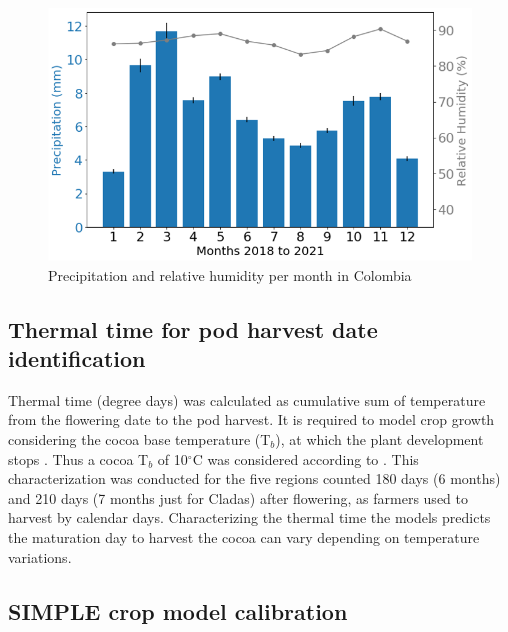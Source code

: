 \documentclass[gene,journal,article,submit,moreauthors,pdftex]{Definitions/mdpi}
\begin{document}
\begin{figure}[h!]
	\centering
	\includegraphics[scale=0.4]{images/rainmonth.png}
	\caption{\footnotesize {Precipitation and relative humidity per month in Colombia \\}}
	\label{fig:rain}
\end{figure}


\subsection{Thermal time for pod harvest date identification}
Thermal time (degree days) was calculated as cumulative sum of temperature from the flowering date to the pod harvest. It is required to model crop growth  considering the cocoa base temperature (T$_{b}$), at which the plant development stops \citep{Ritchie1991}. Thus a cocoa T$_{b}$ of 10$^\circ$C was considered according to \cite{lahive2019}. This characterization was conducted for the five regions counted 180 days (6 months) and 210 days (7 months just for Cladas) after flowering, as farmers used to harvest by calendar days. Characterizing the thermal time the models predicts the maturation day to harvest the cocoa can vary depending on temperature variations.    


\subsection{SIMPLE crop model calibration}
\end{document}
